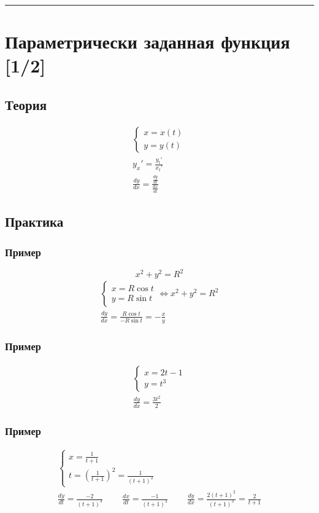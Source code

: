 \documentclass{article}
\begin{document}
\par\noindent\rule{\textwidth}{1pt}
\section{Параметрически заданная функция [1/2]}

\subsection{Теория}

\begin{gather*}
    \begin{cases}
        x = x(t) \\
        y = y(t)
    \end{cases} \\
    y_x' = \frac{y_t'}{x_t'} \\
    \frac{dy}{dx} = \frac{\frac{dy}{dt}}{\frac{dx}{dt}}
\end{gather*}

\subsection{Практика}

\subsubsection{Пример}
\[
    x^2 + y^2 = R^2
\]
\begin{gather*}
    \begin{cases}
        x = R \cos t \\
        y = R \sin t 
    \end{cases} \Leftrightarrow
    x^2 + y^2 = R^2 \\
    \frac{dy}{dx} = \frac{R \cos t}{-R \sin t} = -\frac{x}{y}
\end{gather*}

\subsubsection{Пример}
\begin{gather*}
    \begin{cases}
        x = 2t - 1 \\
        y = t^3
    \end{cases} \\
    \frac{dy}{dx} = \frac{3t^2}{2}
\end{gather*}

\subsubsection{Пример}
\begin{gather*}
    \begin{cases}
        x = \frac{1}{t + 1} \\
        t = \left( \frac{1}{t + 1} \right)^2 = \frac{1}{(t + 1)^2}
    \end{cases} \\
    \frac{dy}{dt} = \frac{-2}{(t + 1)^3} ~~~~~~~~~~
    \frac{dx}{dt} = \frac{-1}{(t + 1)^2} ~~~~~~~~~~
    \frac{dy}{dx} = \frac{2(t + 1)^2}{(t + 1)^3} = \frac{2}{t + 1}
\end{gather*}
\end{document}

